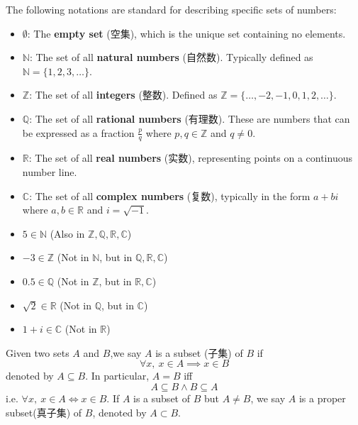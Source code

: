 \documentclass[
	UTF-8,
	11pt, %
	a4paper, %
]{LegrandOrangeBook}
\begin{document}
\newpage

\begin{definition}
The following notations are standard for describing specific sets of numbers:
\begin{itemize}[itemsep = 1em,topsep = 1ex]
    \item $\emptyset$: The \textbf{empty set} (空集), which is the unique set containing no elements.
    \item $\mathbb{N}$: The set of all \textbf{natural numbers} (自然数). Typically defined as $\mathbb{N} = \{1, 2, 3, \dots\}$.
    \item $\mathbb{Z}$: The set of all \textbf{integers} (整数). Defined as $\mathbb{Z} = \{ \dots, -2, -1, 0, 1, 2, \dots \}$.
    \item $\mathbb{Q}$: The set of all \textbf{rational numbers} (有理数). These are numbers that can be expressed as a fraction $\frac{p}{q}$ where $p, q \in \mathbb{Z}$ and $q \neq 0$.
    \item $\mathbb{R}$: The set of all \textbf{real numbers} (实数), representing points on a continuous number line.
    \item $\mathbb{C}$: The set of all \textbf{complex numbers} (复数), typically in the form $a + bi$ where $a, b \in \mathbb{R}$ and $i = \sqrt{-1}$.
\end{itemize}
\end{definition}

\begin{example}\quad
	\begin{itemize}[itemsep = 1em,topsep = 1ex]
    \item $5 \in \mathbb{N}$ (Also in $\mathbb{Z}, \mathbb{Q}, \mathbb{R}, \mathbb{C}$)
    \item $-3 \in \mathbb{Z}$ (Not in $\mathbb{N}$, but in $\mathbb{Q}, \mathbb{R}, \mathbb{C}$)
    \item $0.5 \in \mathbb{Q}$ (Not in $\mathbb{Z}$, but in $\mathbb{R}, \mathbb{C}$)
    \item $\sqrt{2} \in \mathbb{R}$ (Not in $\mathbb{Q}$, but in $\mathbb{C}$)
    \item $1+i \in \mathbb{C}$ (Not in $\mathbb{R}$)
	\end{itemize}
\end{example}

\begin{definition}[Subset]
	Given two sets $A$ and $B$,we say $A$ is a subset (子集) of $B$ if $$\forall x,\ x \in A \implies x \in B$$
	denoted by $A \subseteq B$. In
	particular, $A = B$ iff $$A \subseteq B \land B \subseteq A$$ 
	i.e. $\forall x,\ x\in A \iff x \in B$. If $A$ is a subset of $B$ but $A\neq B$, we say $A$
	is a proper subset(真子集) of $B$, denoted by $A \subset B$.
\end{definition}
\end{document}
